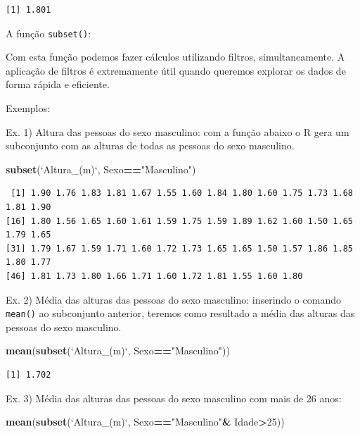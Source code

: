 \documentclass[12pt,portuguese,oneside]{book}
\newenvironment{Shaded}{\begin{snugshade}}{\end{snugshade}}
\newcommand{\KeywordTok}[1]{\textcolor[rgb]{0.13,0.29,0.53}{\textbf{#1}}}
\newcommand{\DataTypeTok}[1]{\textcolor[rgb]{0.13,0.29,0.53}{#1}}
\newcommand{\DecValTok}[1]{\textcolor[rgb]{0.00,0.00,0.81}{#1}}
\newcommand{\StringTok}[1]{\textcolor[rgb]{0.31,0.60,0.02}{#1}}
\newcommand{\OperatorTok}[1]{\textcolor[rgb]{0.81,0.36,0.00}{\textbf{#1}}}
\newcommand{\NormalTok}[1]{#1}
\begin{document}
\begin{verbatim}
[1] 1.801
\end{verbatim}

A função \texttt{subset()}:

Com esta função podemos fazer cálculos utilizando filtros,
simultaneamente. A aplicação de filtros é extremamente útil quando
queremos explorar os dados de forma rápida e eficiente.

Exemplos:

Ex. 1) Altura das pessoas do sexo masculino: com a função abaixo o R
gera um subconjunto com as alturas de todas as pessoas do sexo
masculino.

\begin{Shaded}
\begin{Highlighting}[]
\KeywordTok{subset}\NormalTok{(}\StringTok{`}\DataTypeTok{Altura_(m)}\StringTok{`}\NormalTok{, Sexo}\OperatorTok{==}\StringTok{"Masculino"}\NormalTok{)}
\end{Highlighting}
\end{Shaded}

\begin{verbatim}
 [1] 1.90 1.76 1.83 1.81 1.67 1.55 1.60 1.84 1.80 1.60 1.75 1.73 1.68 1.81 1.90
[16] 1.80 1.56 1.65 1.60 1.61 1.59 1.75 1.59 1.89 1.62 1.60 1.50 1.65 1.79 1.65
[31] 1.79 1.67 1.59 1.71 1.60 1.72 1.73 1.65 1.65 1.50 1.57 1.86 1.85 1.80 1.77
[46] 1.81 1.73 1.80 1.66 1.71 1.60 1.72 1.81 1.55 1.60 1.80
\end{verbatim}

Ex. 2) Média das alturas das pessoas do sexo masculino: inserindo o
comando \texttt{mean()} ao subconjunto anterior, teremos como resultado
a média das alturas das pessoas do sexo masculino.

\begin{Shaded}
\begin{Highlighting}[]
\KeywordTok{mean}\NormalTok{(}\KeywordTok{subset}\NormalTok{(}\StringTok{`}\DataTypeTok{Altura_(m)}\StringTok{`}\NormalTok{, Sexo}\OperatorTok{==}\StringTok{"Masculino"}\NormalTok{))}
\end{Highlighting}
\end{Shaded}

\begin{verbatim}
[1] 1.702
\end{verbatim}

Ex. 3) Média das alturas das pessoas do sexo masculino com mais de 26
anos:

\begin{Shaded}
\begin{Highlighting}[]
\KeywordTok{mean}\NormalTok{(}\KeywordTok{subset}\NormalTok{(}\StringTok{`}\DataTypeTok{Altura_(m)}\StringTok{`}\NormalTok{, Sexo}\OperatorTok{==}\StringTok{"Masculino"}\OperatorTok{&}\StringTok{ }\NormalTok{Idade}\OperatorTok{>}\DecValTok{25}\NormalTok{))}
\end{Highlighting}
\end{Shaded}
\end{document}
